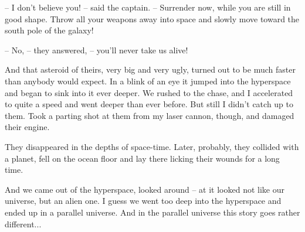 \documentclass[ebook,oneside,final,openright]{memoir}
\begin{document}
– I don’t believe you! – said the captain. – Surrender now, while you are still in good shape. Throw all your weapons away into space and slowly move toward the south pole of the galaxy!\par
– No, – they answered, – you’ll never take us alive!\par
And that asteroid of theirs, very big and very ugly, turned out to be much faster than anybody would expect. In a blink of an eye it jumped into the hyperspace and began to sink into it ever deeper. We rushed to the chase, and I accelerated to quite a speed and went deeper than ever before. But still I didn’t catch up to them. Took a parting shot at them from my laser cannon, though, and damaged their engine.\par
They disappeared in the depths of space-time. Later, probably, they collided with a planet, fell on the ocean floor and lay there licking their wounds for a long time.\par
And we came out of the hyperspace, looked around – at it looked not like our universe, but an alien one. I guess we went too deep into the hyperspace and ended up in a parallel universe. And in the parallel universe this story goes rather different...
\end{document}

